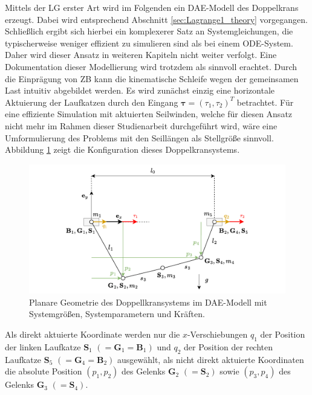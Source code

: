 Mittels der LG erster Art wird im Folgenden ein DAE-Modell des Doppelkrans erzeugt. Dabei wird entsprechend Abschnitt \ref{sec:Lagrange1_theory} vorgegangen. Schließlich ergibt sich hierbei ein komplexerer Satz an Systemgleichungen, die typischerweise weniger effizient zu simulieren sind als bei einem ODE-System. Daher wird dieser Ansatz in weiteren Kapiteln nicht weiter verfolgt. Eine Dokumentation dieser Modellierung wird trotzdem als sinnvoll erachtet. Durch die Einprägung von ZB kann die kinematische Schleife wegen der gemeinsamen Last intuitiv abgebildet werden. Es wird zunächst einzig eine horizontale Aktuierung der Laufkatzen durch den Eingang $\boldsymbol{\tau} = (\tau_{1}, \tau_{2})^T$ betrachtet. Für eine effiziente Simulation mit aktuierten Seilwinden, welche für diesen Ansatz nicht mehr im Rahmen dieser Studienarbeit durchgeführt wird, wäre eine Umformulierung des Problems mit den Seillängen als Stellgröße sinnvoll. \cite{RudolphSkriptFlach} Abbildung \ref{fig:DAE_double_crane_diagram} zeigt die Konfiguration dieses Doppelkransystems.

\begin{figure}[ht]
	\begin{center}
		\includegraphics[scale=1]{Pictures/DAE_double_crane_cartesian_diagram.pdf}
	\end{center}
	\caption[Planare Geometrie des Doppellkransystems im DAE-Modell]
	{Planare Geometrie des Doppellkransystems im DAE-Modell mit Systemgrößen, Systemparametern und Kräften.}
	\label{fig:DAE_double_crane_diagram}
\end{figure}

Als direkt aktuierte Koordinate werden nur die $x$-Verschiebungen $q_1$ der Position der linken Laufkatze $\mathbf{S}_1$ $(= \mathbf{G}_1 = \mathbf{B}_1)$ und $q_2$ der Position der rechten Laufkatze $\mathbf{S}_5$ $(= \mathbf{G}_4 = \mathbf{B}_2)$ ausgewählt, als nicht direkt aktuierte Koordinaten die absolute Position $(p_1, p_2)$ des Gelenks $\mathbf{G}_2$ $(= \mathbf{S}_2)$ sowie $(p_3, p_4)$ des Gelenks $\mathbf{G}_3$ $(=\mathbf{S}_4)$. 

